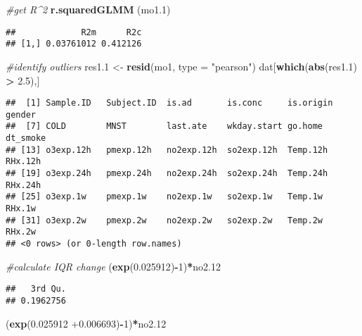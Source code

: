 \documentclass[12pt,]{article}
\newenvironment{Shaded}{\begin{snugshade}}{\end{snugshade}}
\newcommand{\CommentTok}[1]{\textcolor[rgb]{0.56,0.35,0.01}{\textit{#1}}}
\newcommand{\DataTypeTok}[1]{\textcolor[rgb]{0.13,0.29,0.53}{#1}}
\newcommand{\DecValTok}[1]{\textcolor[rgb]{0.00,0.00,0.81}{#1}}
\newcommand{\FloatTok}[1]{\textcolor[rgb]{0.00,0.00,0.81}{#1}}
\newcommand{\KeywordTok}[1]{\textcolor[rgb]{0.13,0.29,0.53}{\textbf{#1}}}
\newcommand{\NormalTok}[1]{#1}
\newcommand{\OperatorTok}[1]{\textcolor[rgb]{0.81,0.36,0.00}{\textbf{#1}}}
\newcommand{\StringTok}[1]{\textcolor[rgb]{0.31,0.60,0.02}{#1}}
\begin{document}
\begin{Shaded}
\begin{Highlighting}[]
\CommentTok{#get R^2}
\KeywordTok{r.squaredGLMM}\NormalTok{ (mo1}\FloatTok{.1}\NormalTok{)}
\end{Highlighting}
\end{Shaded}

\begin{verbatim}
##             R2m      R2c
## [1,] 0.03761012 0.412126
\end{verbatim}

\begin{Shaded}
\begin{Highlighting}[]
\CommentTok{#identify outliers}
\NormalTok{res1}\FloatTok{.1}\NormalTok{ <-}\StringTok{ }\KeywordTok{resid}\NormalTok{(mo1, }\DataTypeTok{type =} \StringTok{"pearson"}\NormalTok{)}
\NormalTok{dat[}\KeywordTok{which}\NormalTok{(}\KeywordTok{abs}\NormalTok{(res1}\FloatTok{.1}\NormalTok{) }\OperatorTok{>}\StringTok{ }\FloatTok{2.5}\NormalTok{),]}
\end{Highlighting}
\end{Shaded}

\begin{verbatim}
##  [1] Sample.ID   Subject.ID  is.ad       is.conc     is.origin   gender     
##  [7] COLD        MNST        last.ate    wkday.start go.home     dt_smoke   
## [13] o3exp.12h   pmexp.12h   no2exp.12h  so2exp.12h  Temp.12h    RHx.12h    
## [19] o3exp.24h   pmexp.24h   no2exp.24h  so2exp.24h  Temp.24h    RHx.24h    
## [25] o3exp.1w    pmexp.1w    no2exp.1w   so2exp.1w   Temp.1w     RHx.1w     
## [31] o3exp.2w    pmexp.2w    no2exp.2w   so2exp.2w   Temp.2w     RHx.2w     
## <0 rows> (or 0-length row.names)
\end{verbatim}

\begin{Shaded}
\begin{Highlighting}[]
\CommentTok{#calculate IQR change}
\NormalTok{(}\KeywordTok{exp}\NormalTok{(}\FloatTok{0.025912}\NormalTok{)}\OperatorTok{-}\DecValTok{1}\NormalTok{)}\OperatorTok{*}\NormalTok{no2}\FloatTok{.12}
\end{Highlighting}
\end{Shaded}

\begin{verbatim}
##   3rd Qu. 
## 0.1962756
\end{verbatim}

\begin{Shaded}
\begin{Highlighting}[]
\NormalTok{(}\KeywordTok{exp}\NormalTok{(}\FloatTok{0.025912} \FloatTok{+0.006693}\NormalTok{)}\OperatorTok{-}\DecValTok{1}\NormalTok{)}\OperatorTok{*}\NormalTok{no2}\FloatTok{.12}
\end{Highlighting}
\end{Shaded}
\end{document}
